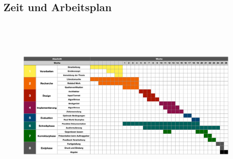 \begin{landscape}

\chapter{Zeit und Arbeitsplan}

\begin{figure}[hbtp]
	\centering
	\includegraphics[trim=0 0 0 0, height=9cm]{pics/Zeitplan}
\end{figure}

\end{landscape}